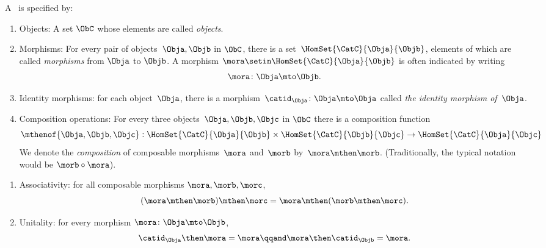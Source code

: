 {\begin{forslides}
        \begin{ctdefinition}
            \label{def:category-var}
            A \emph{}~\CatC is specified by:
            \begin{body}
                \constit
                \begin{enumerate}
                    \item Objects: A set $\ObC$ whose elements are called \emph{objects}.
                    \item Morphisms: For every pair of objects~$\Obja,\Objb$ in $\ObC$, there is a set~$\HomSet{\CatC}{\Obja}{\Objb}$, elements of which are called \emph{morphisms} from $\Obja$ to $\Objb$.
                          A morphism $\mora \setin \HomSet{\CatC}{\Obja}{\Objb}$ is often indicated by writing
                          \begin{equation}
                              \mora \colon \Obja \mto \Objb.
                          \end{equation}
                    \item Identity morphisms: for each object~$\Obja$, there is a morphism~$\catid_{\Obja}\colon \Obja \mto \Obja$  called \emph{the identity morphism of~$\Obja$}.
                    \item Composition operations: For every three objects~$\Obja,\Objb,\Objc$ in $\ObC$ there is a composition function
                          \begin{equation}
                              \mthenof{\Obja,\Objb,\Objc}: \HomSet{\CatC}{\Obja}{\Objb} \times \HomSet{\CatC}{\Objb}{\Objc}\to \HomSet{\CatC}{\Obja}{\Objc}
                          \end{equation}
                          We denote the \emph{composition} of composable morphisms~$\mora$ and~$\morb$ by~$\mora \mthen \morb$.
                          (Traditionally, the typical notation would be $\morb \circ \mora$).

                \end{enumerate}
                \condit
                \begin{enumerate}
                    \item Associativity: for all composable morphisms $\mora, \morb, \morc$,
                          \begin{equation}
                              (\mora\mthen \morb)
                              \mthen \morc= \mora \mthen (\morb \mthen \morc).
                          \end{equation}
                    \item Unitality: for every morphism $\mora \colon \Obja \mto \Objb$,
                          \begin{equation}
                              \catid_{\Obja} \then \mora = \mora \qqand \mora \then \catid_{\Objb} = \mora.
                          \end{equation}
                \end{enumerate}
            \end{body}
        \end{ctdefinition}


\end{forslides}}
